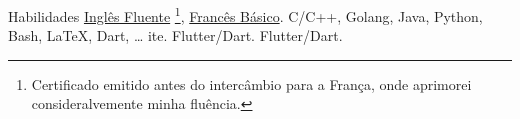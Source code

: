 
\begin{rubric}{Habilidades}
\entry*[Línguas]
    \href{https://drive.google.com/file/d/1PTySqO2pdP8BjxMf1Vgrz0EzpBxw9jYq/view?usp=sharing}{Inglês Fluente}
    \footnote{Certificado emitido antes do intercâmbio para a França, onde aprimorei consideralvemente minha fluência.},
    \href{https://drive.google.com/file/d/1yjeEiOAcLmwbUxXELqplRyCWaUSi7e8C/view?usp=sharing}{Francês Básico}.
    C/C++, Golang, Java, Python, Bash, \LaTeX, Dart, \ldots
{}%
    ite.
\entry*[Web]
    Flutter/Dart.
    Flutter/Dart.
\end{rubric}
